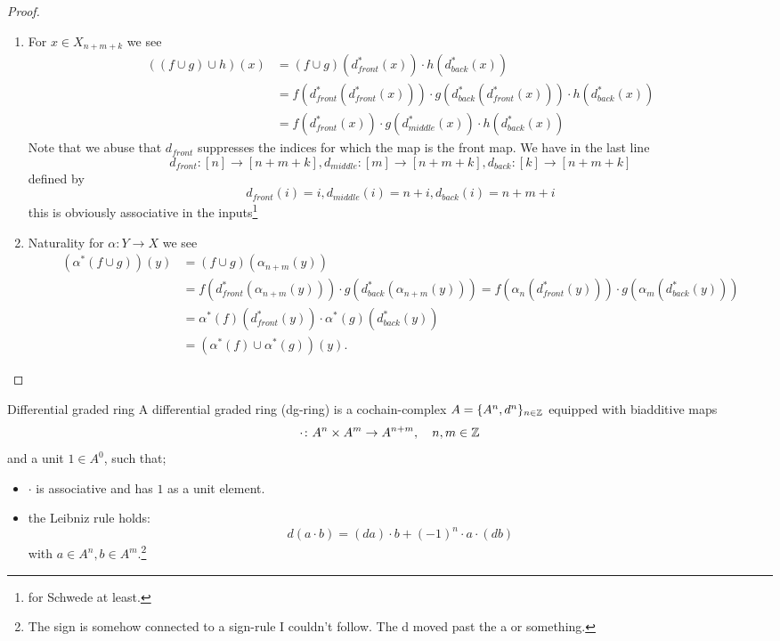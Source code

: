 \documentclass[language=english]{TemplateLecture}
\begin{document}
\begin{proof}
\begin{enumerate}
        \item For \(x \in X_{n+m+k}\) we see
        \[\begin{split}
            ((f\cup g) \cup h)(x) &= (f\cup g) (d_{front}^*(x)) \cdot h(d_{back}^*(x)) \\
            &= f(d_{front}^*(d_{front}^*(x))) \cdot g(d_{back}^*(d_{front}^*(x))) \cdot h(d_{back}^*(x))\\
            & = f(d_{front}^*(x)) \cdot g(d_{middle}^*(x)) \cdot h(d_{back}^*(x))
        \end{split}\]
        Note that we abuse that \(d_{front}\) suppresses the indices for which the map is the front map.
        We have in the last line
        \[d_{front}\colon[n] \to [n+m+k], d_{middle}\colon [m] \to [n+m+k], d_{back}\colon [k] \to [n+m+k]\]
        defined by
        \[d_{front}(i) = i, d_{middle}(i) = n+i, d_{back}(i) = n+m+i\]
        this is obviously associative in the inputs\footnote{for Schwede at least.}
        \item Naturality for \(\alpha\colon Y \to X\) we see
        \[\begin{split}
            (\alpha^*(f\cup g))(y) &= (f\cup g)(\alpha_{n+m}(y)) \\
            &= f(d_{front}^*(\alpha_{n+m}(y))) \cdot g(d_{back}^*(\alpha_{n+m}(y))) = f(\alpha_n(d_{front}^*(y))) \cdot g(\alpha_m(d_{back}^*(y))) \\
            &= \alpha^*(f)(d_{front}^*(y)) \cdot \alpha^*(g)(d_{back}^*(y)) \\
            &= (\alpha^*(f) \cup \alpha^*(g))(y).
        \end{split}\]
    \end{enumerate}
\end{proof}

\begin{defi}{Differential graded ring}{}
    A differential graded ring (dg-ring) is a cochain-complex \(A = \{A^n, d^n\}_{n \in \mathbb{Z}}\) equipped with biadditive maps
    \[\cdot\colon A^n \times A^m \to A^{n+m}, \quad n,m \in \mathbb{Z} \]
    and a unit \(1 \in A^0\), such that;
    \begin{itemize}
        \item \(\cdot\) is associative and has \(1\) as a unit element.
        \item the Leibniz rule holds:
        \[d(a\cdot b) = (da) \cdot b + (-1)^n \cdot a \cdot (db)\]
        with \(a \in A^n, b \in A^m\).\footnote{The sign is somehow connected to a sign-rule I couldn't follow. The d moved past the a or something.}
    \end{itemize}
\end{defi}
\end{document}
